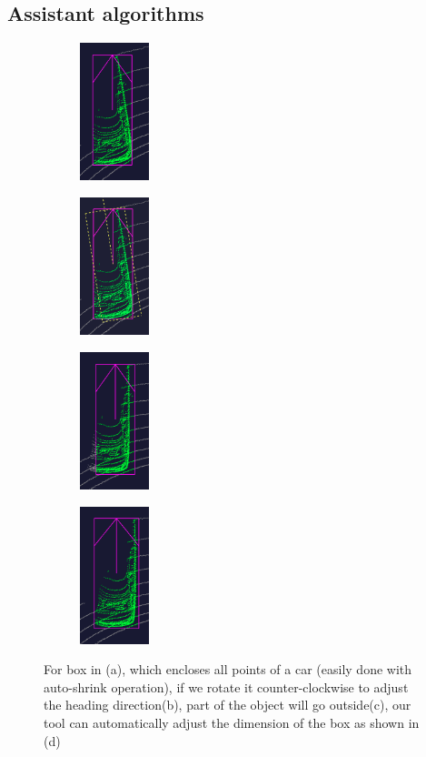 \documentclass[letterpaper, 10 pt, conference]{ieeeconf}  %
\begin{document}
\subsection{Assistant algorithms}
\begin{figure}[ht]
	\centering

	\begin{subfigure}[t]{0.2\linewidth}
		\includegraphics[height=4cm]{./figures/points-enclosed}
		\caption{}

	\end{subfigure}\hfill
	\begin{subfigure}[t]{0.2\linewidth}
		\includegraphics[height=4cm]{./figures/adjust-naively}
		\caption{}
		\label{fig:box-rotate-in-subview}
	\end{subfigure}\hfill
	\begin{subfigure}[t]{0.2\linewidth}
		\includegraphics[height=4cm]{./figures/rotate-fail}
		\caption{}
	\end{subfigure}\hfill
	\begin{subfigure}[t]{0.2\linewidth}
		\includegraphics[height=4cm]{./figures/rotate-success}
		\caption{}
	\end{subfigure}\hfill
	\caption{For box in (a), which encloses all points of a car (easily done with auto-shrink operation), if we rotate it counter-clockwise to adjust the heading direction(b), part of the object will go outside(c), our tool can automatically adjust the dimension of the box as shown in (d)}
	\label{fig:boundary-aware-rotation}
\vspace{-0.3cm}
\end{figure}
\end{document}
